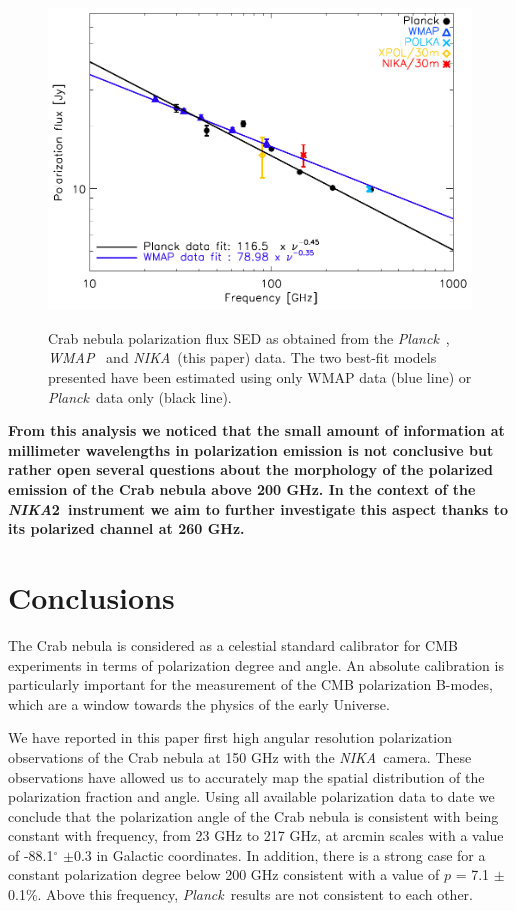 \documentclass[twocolumn,traditabstract]{aa}
\def\NIKA{\textit{NIKA}}
\def\Planck{\textit{Planck}}
\def\WMAP{\textit{WMAP}}
\begin{document}
\begin{figure}
  \centering
             { \includegraphics[width=1\linewidth,keepaspectratio]{figures/Crab_SED_ipol_test.pdf}}
           \caption{Crab nebula polarization flux SED as obtained from the \Planck\ \citep{2015arXiv150702058P}, \WMAP\ \citep{2011ApJS..192...19W} and \NIKA\ (this paper) data. The two best-fit models presented have been estimated using only WMAP data (blue line) or \Planck\ data only (black line).}
\label{crab_SED_ipol}		
  \end{figure} 
 \noindent
\textbf{From this analysis we noticed that the small amount of information at millimeter wavelengths in polarization emission is not conclusive but rather open several questions about the morphology of the polarized emission of the Crab nebula above 200 GHz. In the context of the \NIKA2\ instrument we aim to further investigate this aspect thanks to its polarized channel at 260 GHz.} 


\section{Conclusions}\label{sec:conclusions}
The Crab nebula is considered as a celestial standard calibrator for CMB experiments in
terms of polarization degree and angle. An absolute calibration is
particularly important for the measurement of the CMB polarization B-modes,
which are a window towards the physics of the early Universe.

We have reported in this paper first high angular resolution polarization observations
of the Crab nebula at 150 GHz with the \NIKA\ camera. These observations have
allowed us to accurately map the spatial distribution of the polarization
fraction and angle.  
Using all available polarization data to date we conclude that the
polarization angle of the Crab nebula is consistent with being constant with
frequency, from 23 GHz to 217 GHz, at arcmin scales with a value of
-88.1$^{\circ}$ $\pm$0.3 in Galactic coordinates.
In addition, there is a strong case for a constant polarization degree below 200 GHz consistent with a value of $p$ = 7.1 $\pm$ 0.1\%. Above this frequency, \Planck\ results are not consistent to each other. 
\end{document}
